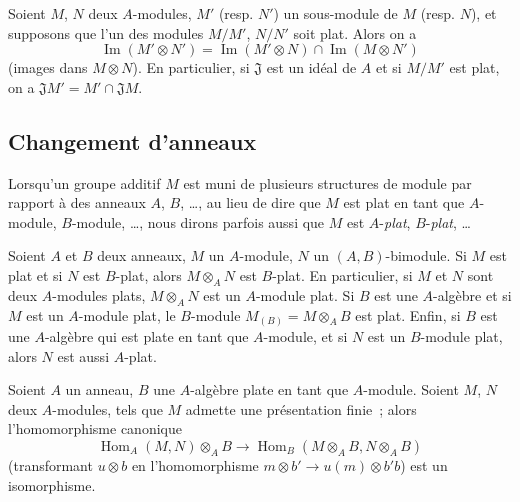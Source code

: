 \begin{env}[6.1.4]
\label{0.6.1.4-fr}
Soient $M$, $N$ deux $A$-modules, $M'$ (resp. $N'$) un sous-module de $M$
(resp. $N$), et supposons que l'un des modules $M/M'$, $N/N'$ soit plat.
Alors on a
\[
  \operatorname{Im}(M'\otimes N')
  =\operatorname{Im}(M'\otimes N)\cap\operatorname{Im}(M\otimes N')
\]
(images dans $M\otimes N$). En particulier, si $\mathfrak{J}$ est un idéal
de $A$ et si $M/M'$ est plat, on a
$\mathfrak{J}M'=M'\cap\mathfrak{J}M$.
\end{env}

\subsection{Changement d'anneaux}
\label{subsection:0.6.2-fr}

Lorsqu'un groupe additif $M$ est muni de plusieurs structures de module par
rapport à des anneaux $A$, $B$, \ldots, au lieu de dire que $M$ est plat en
tant que $A$-module, $B$-module, \ldots, nous dirons parfois aussi que $M$
est $A$-\emph{plat}, $B$-\emph{plat}, \ldots

\begin{env}[6.2.1]
\label{0.6.2.1-fr}
Soient $A$ et $B$ deux anneaux, $M$ un $A$-module, $N$ un
$(A,B)$-bimodule. Si $M$ est plat et si $N$ est $B$-plat, alors
$M\otimes_A N$ est $B$-plat. En particulier, si $M$ et $N$ sont deux
$A$-modules plats, $M\otimes_A N$ est un $A$-module plat. Si $B$ est une
$A$-algèbre et si $M$ est
un $A$-module plat, le $B$-module $M_{(B)}=M\otimes_A B$ est plat. Enfin, si
$B$ est une $A$-algèbre qui est plate en tant que $A$-module, et si $N$ est
un $B$-module plat, alors $N$ est aussi $A$-plat.
\end{env}

\begin{env}[6.2.2]
\label{0.6.2.2-fr}
Soient $A$ un anneau, $B$ une $A$-algèbre plate en tant que $A$-module.
Soient $M$, $N$ deux $A$-modules, tels que $M$ admette une présentation
finie~; alors l'homomorphisme canonique
\[
  \operatorname{Hom}_A(M,N)\otimes_A B
  \longrightarrow
  \operatorname{Hom}_B(M\otimes_A B,N\otimes_A B)
  \tag{6.2.2.1}
\]
(transformant $u\otimes b$ en l'homomorphisme
$m\otimes b'\to u(m)\otimes b'b$) est un isomorphisme.
\end{env}

